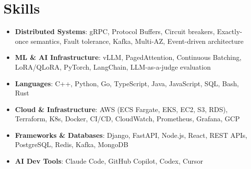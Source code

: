 \documentclass[letterpaper,11pt]{article}
\newcommand{\resumeSubHeadingListStart}{\begin{itemize}[leftmargin=0.15in, label={}]}
\newcommand{\resumeSubHeadingListEnd}{\end{itemize}}
\newcommand{\resumeSkillHeading}[2]{%
  \item\small{\textbf{#1}: #2 \vspace{-9pt}}%
}
\begin{document}
\section{Skills}
  \resumeSubHeadingListStart
    \resumeSkillHeading{Distributed Systems}{gRPC, Protocol Buffers, Circuit breakers, Exactly-once semantics, Fault tolerance, Kafka, Multi-AZ, Event-driven architecture}
    \resumeSkillHeading{ML \& AI Infrastructure}{vLLM, PagedAttention, Continuous Batching, LoRA/QLoRA, PyTorch, LangChain, LLM-as-a-judge evaluation}
    \resumeSkillHeading{Languages}{C++, Python, Go, TypeScript, Java, JavaScript, SQL, Bash, Rust}
    \resumeSkillHeading{Cloud \& Infrastructure}{AWS (ECS Fargate, EKS, EC2, S3, RDS), Terraform, K8s, Docker, CI/CD, CloudWatch, Prometheus, Grafana, GCP}
    \resumeSkillHeading{Frameworks \& Databases}{Django, FastAPI, Node.js, React, REST APIs, PostgreSQL, Redis, Kafka, MongoDB}
    \resumeSkillHeading{AI Dev Tools}{Claude Code, GitHub Copilot, Codex, Cursor}
  \resumeSubHeadingListEnd
\end{document}
